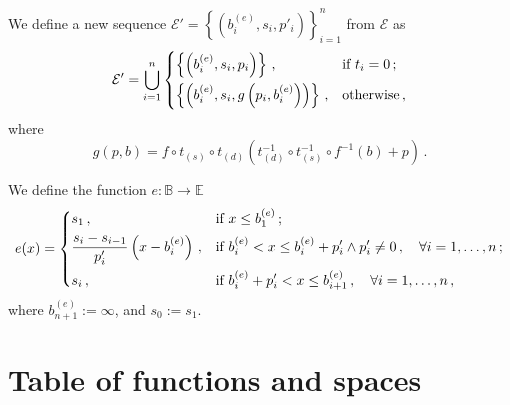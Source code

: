 \documentclass[a4paper,9pt]{article}
\begin{document}
We define a new sequence $ \mathcal{E'} =  \left\{\left( b_i^{(e)}, s_i, p'_i \right)\right\}_{i=1}^{n}$ from $ \mathcal{E} $ as
\begin{equation}
	\mathcal{E'} = \bigcup_{i=1}^{n} \begin{dcases}
		\left\{\left( b_i^{(e)}, s_i, p_i \right)\right\}\,, & \text{if $ t_i =0 $}\,;\\
		\left\{\left( b_i^{(e)}, s_i,g \left( p_i, b_i^{(e)} \right)  \right)\right\}\,, & \text{otherwise}\,,\\
	\end{dcases}
	\label{eq:eprime}
\end{equation}
where 
\begin{equation}
	g(p,b) =f \circ t_{(s)} \circ t_{(d)} \left(  t_{(d)}^{-1} \circ  t_{(s)}^{-1} \circ f^{-1}(b) + p \right)\,.
	\label{eq:iureio}
\end{equation}

We define the function $ e:\mathbb{B}\rightarrow \mathbb{E} $
\begin{equation}
	e(x) = \begin{dcases}
		s_1\,, & \text{if $ x\leq b_1^{(e)} $}\,;\\
		\frac{s_i-s_{i-1}}{p'_i} \left( x-b_{i}^{(e)} \right) \,, & \text{if $ b_{i}^{(e)} < x \leq b_{i}^{(e)}+p'_i \land p'_i \neq 0\,,\quad \forall i=1,\dots,n$}\,;\\
		s_i\,, &\text{if $ b_{i}^{(e)}+p'_i < x \leq b_{i+1}^{(e)}\,,\quad \forall i=1,\dots,n$}\,,\\
	\end{dcases}
	\label{eq:e}
\end{equation}
where $ b_{n+1}^{(e)} := \infty $, and $ s_0 := s_1 $.





    \appendix

    \section{Table of functions and spaces}
\end{document}
